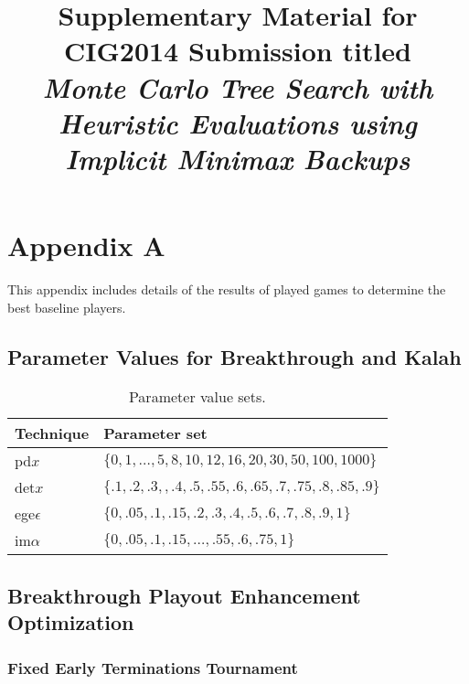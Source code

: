 \documentclass{article}
\title{Supplementary Material for CIG2014 Submission titled\\{\it Monte Carlo Tree Search with Heuristic Evaluations using Implicit Minimax Backups}}
\author{}
\date{}
\begin{document}
\maketitle %

\section{Appendix A}

This appendix includes details of the results of played games to determine the best baseline players. 

\subsection{Parameter Values for Breakthrough and Kalah}

\begin{table}[h!]
\begin{center}
\begin{tabular}{|l|l|}
\hline
Technique & Parameter set \\
\hline
pd$x$          & $\{ 0, 1, \ldots, 5, 8, 10, 12, 16, 20, 30, 50, 100, 1000 \}$ \\
det$x$         & $\{ .1, .2, .3, , .4, .5, .55, .6, .65, .7, .75, .8, .85, .9 \}$ \\
ege$\epsilon$  & $\{ 0, .05, .1, .15, .2, .3, .4, .5, .6, .7, .8, .9, 1 \}$ \\
im$\alpha$     & $\{ 0, .05, .1, .15, \ldots, .55, .6, .75, 1 \}$ \\
\hline
\end{tabular}
\end{center}
\caption{Parameter value sets.}
\label{tbl:parmsets}
\end{table}

\subsection{Breakthrough Playout Enhancement Optimization}

\subsubsection{Fixed Early Terminations Tournament}
\end{document}
